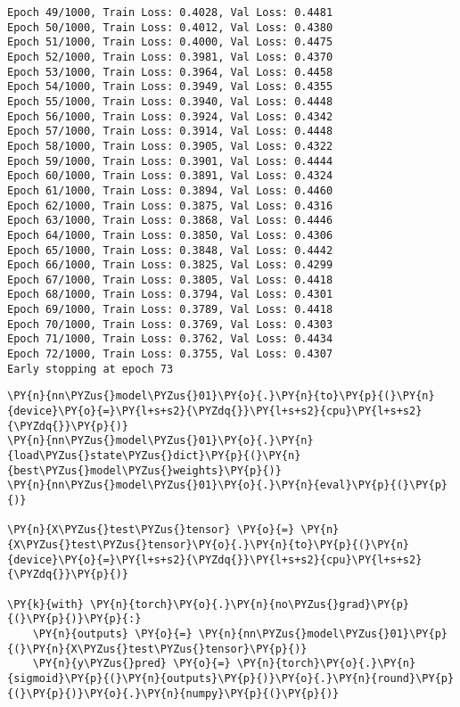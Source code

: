 \begin{Verbatim}[commandchars=\\\{\}]
Epoch 49/1000, Train Loss: 0.4028, Val Loss: 0.4481
Epoch 50/1000, Train Loss: 0.4012, Val Loss: 0.4380
Epoch 51/1000, Train Loss: 0.4000, Val Loss: 0.4475
Epoch 52/1000, Train Loss: 0.3981, Val Loss: 0.4370
Epoch 53/1000, Train Loss: 0.3964, Val Loss: 0.4458
Epoch 54/1000, Train Loss: 0.3949, Val Loss: 0.4355
Epoch 55/1000, Train Loss: 0.3940, Val Loss: 0.4448
Epoch 56/1000, Train Loss: 0.3924, Val Loss: 0.4342
Epoch 57/1000, Train Loss: 0.3914, Val Loss: 0.4448
Epoch 58/1000, Train Loss: 0.3905, Val Loss: 0.4322
Epoch 59/1000, Train Loss: 0.3901, Val Loss: 0.4444
Epoch 60/1000, Train Loss: 0.3891, Val Loss: 0.4324
Epoch 61/1000, Train Loss: 0.3894, Val Loss: 0.4460
Epoch 62/1000, Train Loss: 0.3875, Val Loss: 0.4316
Epoch 63/1000, Train Loss: 0.3868, Val Loss: 0.4446
Epoch 64/1000, Train Loss: 0.3850, Val Loss: 0.4306
Epoch 65/1000, Train Loss: 0.3848, Val Loss: 0.4442
Epoch 66/1000, Train Loss: 0.3825, Val Loss: 0.4299
Epoch 67/1000, Train Loss: 0.3805, Val Loss: 0.4418
Epoch 68/1000, Train Loss: 0.3794, Val Loss: 0.4301
Epoch 69/1000, Train Loss: 0.3789, Val Loss: 0.4418
Epoch 70/1000, Train Loss: 0.3769, Val Loss: 0.4303
Epoch 71/1000, Train Loss: 0.3762, Val Loss: 0.4434
Epoch 72/1000, Train Loss: 0.3755, Val Loss: 0.4307
Early stopping at epoch 73
    \end{Verbatim}

    \begin{tcolorbox}[breakable, size=fbox, boxrule=1pt, pad at break*=1mm,colback=cellbackground, colframe=cellborder]
\begin{Verbatim}[commandchars=\\\{\}]
\PY{n}{nn\PYZus{}model\PYZus{}01}\PY{o}{.}\PY{n}{to}\PY{p}{(}\PY{n}{device}\PY{o}{=}\PY{l+s+s2}{\PYZdq{}}\PY{l+s+s2}{cpu}\PY{l+s+s2}{\PYZdq{}}\PY{p}{)}
\PY{n}{nn\PYZus{}model\PYZus{}01}\PY{o}{.}\PY{n}{load\PYZus{}state\PYZus{}dict}\PY{p}{(}\PY{n}{best\PYZus{}model\PYZus{}weights}\PY{p}{)}
\PY{n}{nn\PYZus{}model\PYZus{}01}\PY{o}{.}\PY{n}{eval}\PY{p}{(}\PY{p}{)}

\PY{n}{X\PYZus{}test\PYZus{}tensor} \PY{o}{=} \PY{n}{X\PYZus{}test\PYZus{}tensor}\PY{o}{.}\PY{n}{to}\PY{p}{(}\PY{n}{device}\PY{o}{=}\PY{l+s+s2}{\PYZdq{}}\PY{l+s+s2}{cpu}\PY{l+s+s2}{\PYZdq{}}\PY{p}{)}

\PY{k}{with} \PY{n}{torch}\PY{o}{.}\PY{n}{no\PYZus{}grad}\PY{p}{(}\PY{p}{)}\PY{p}{:}
    \PY{n}{outputs} \PY{o}{=} \PY{n}{nn\PYZus{}model\PYZus{}01}\PY{p}{(}\PY{n}{X\PYZus{}test\PYZus{}tensor}\PY{p}{)}
    \PY{n}{y\PYZus{}pred} \PY{o}{=} \PY{n}{torch}\PY{o}{.}\PY{n}{sigmoid}\PY{p}{(}\PY{n}{outputs}\PY{p}{)}\PY{o}{.}\PY{n}{round}\PY{p}{(}\PY{p}{)}\PY{o}{.}\PY{n}{numpy}\PY{p}{(}\PY{p}{)}
\end{Verbatim}
\end{tcolorbox}

